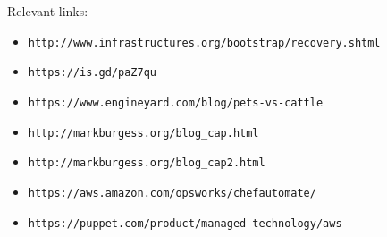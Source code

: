 \documentclass[xga]{xdvislides}
\begin{document}
Relevant links:
\begin{itemize}
	\item {\tt http://www.infrastructures.org/bootstrap/recovery.shtml}
	\item {\tt https://is.gd/paZ7qu}
	\item {\tt https://www.engineyard.com/blog/pets-vs-cattle}
	\item {\tt http://markburgess.org/blog\_cap.html}
	\item {\tt http://markburgess.org/blog\_cap2.html}
	\item {\tt https://aws.amazon.com/opsworks/chefautomate/}
	\item {\tt https://puppet.com/product/managed-technology/aws}
\end{itemize}
\end{document}

